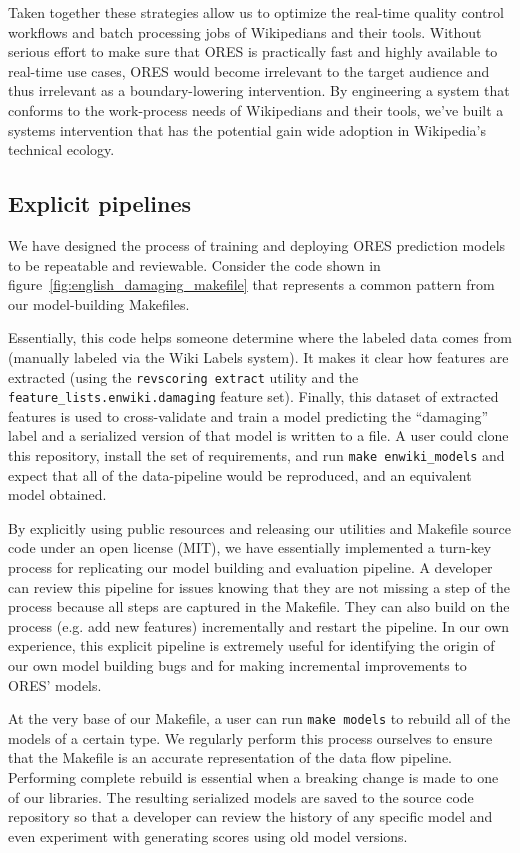 Taken together these strategies allow us to optimize the real-time quality control workflows and batch processing jobs of Wikipedians and their tools.  Without serious effort to make sure that ORES is practically fast and highly available to real-time use cases, ORES would become irrelevant to the target audience and thus irrelevant as a boundary-lowering intervention.  By engineering a system that conforms to the work-process needs of Wikipedians and their tools, we've built a systems intervention that has the potential gain wide adoption in Wikipedia's technical ecology.

\subsection{Explicit pipelines}
\label{sec:appendix.explicit_pipelines}
We have designed the process of training and deploying ORES prediction models to be repeatable and reviewable.  Consider the code shown in figure~\ref{fig:english_damaging_makefile} that represents a common pattern from our model-building Makefiles.

Essentially, this code helps someone determine where the labeled data comes from (manually labeled via the Wiki Labels system).  It makes it clear how features are extracted (using the \texttt{revscoring extract} utility and the \texttt{feature\_lists.enwiki.damaging} feature set).  Finally, this dataset of extracted features is used to cross-validate and train a model predicting the ``damaging'' label and a serialized version of that model is written to a file.  A user could clone this repository, install the set of requirements, and run \texttt{make enwiki\_models} and expect that all of the data-pipeline would be reproduced, and an equivalent model obtained.

By explicitly using public resources and releasing our utilities and Makefile source code under an open license (MIT), we have essentially implemented a turn-key process for replicating our model building and evaluation pipeline.  A developer can review this pipeline for issues knowing that they are not missing a step of the process because all steps are captured in the Makefile.  They can also build on the process (e.g. add new features) incrementally and restart the pipeline.  In our own experience, this explicit pipeline is extremely useful for identifying the origin of our own model building bugs and for making incremental improvements to ORES' models.

At the very base of our Makefile, a user can run \texttt{make models} to rebuild all of the models of a certain type.  We regularly perform this process ourselves to ensure that the Makefile is an accurate representation of the data flow pipeline.  Performing complete rebuild is essential when a breaking change is made to one of our libraries.  The resulting serialized models are saved to the source code repository so that a developer can review the history of any specific model and even experiment with generating scores using old model versions.

